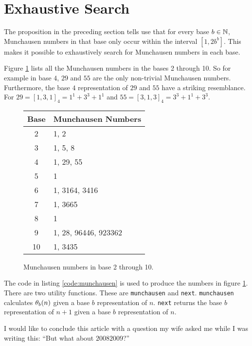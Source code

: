 \section*{Exhaustive Search}

The proposition in the preceding section tells use that for every base 
$b \in \N$, Munchausen numbers in that base only occur within the interval 
$[1,2b^{b}]$. This makes it possible to exhaustively search for Munchausen 
numbers in each base.

Figure \ref{figure:munchausen} lists all the Munchausen numbers in the bases 2
through 10. So for example in base $4$, $29$ and $55$ are the only non-trivial
Munchausen numbers. Furthermore, the base $4$ representation of $29$ and $55$
have a striking resemblance. For $29 = [1,3,1]_{4} = 1^{1} + 3^{3} + 1^{1}$ and
$55 = [3,1,3]_{4} = 3^{3} + 1^{1} + 3^{3}$.

\begin{figure}[bh]
	\begin{center}
		\caption{Munchausen numbers in base 2 through 10.}
		\label{figure:munchausen}
		\begin{tabular}{|c|l|}
			\hline
			Base & Munchausen Numbers \\
			\hline
			2  & 1, 2 \\
			3  & 1, 5, 8 \\
			4  & 1, 29, 55 \\
			5  & 1 \\
			6  & 1, 3164, 3416 \\
			7  & 1, 3665 \\
			8  & 1 \\
			9  & 1, 28, 96446, 923362 \\
			10 & 1, 3435 \\
			\hline
		\end{tabular}
	\end{center}
\end{figure}

The code in listing \ref{code:munchausen} is used to produce the numbers in
figure \ref{figure:munchausen}. There are two utility functions. These are 
\lstinline!munchausen! and \lstinline!next!. \lstinline!munchausen! calculates 
$\P_{b}(n)$ given a base $b$ representation of $n$. \lstinline!next! returns the
base $b$ representation of $n+1$ given a base $b$ representation of $n$.

I would like to conclude this article with a question my wife asked me while I
was writing this: ``But what about $20082009$?''



